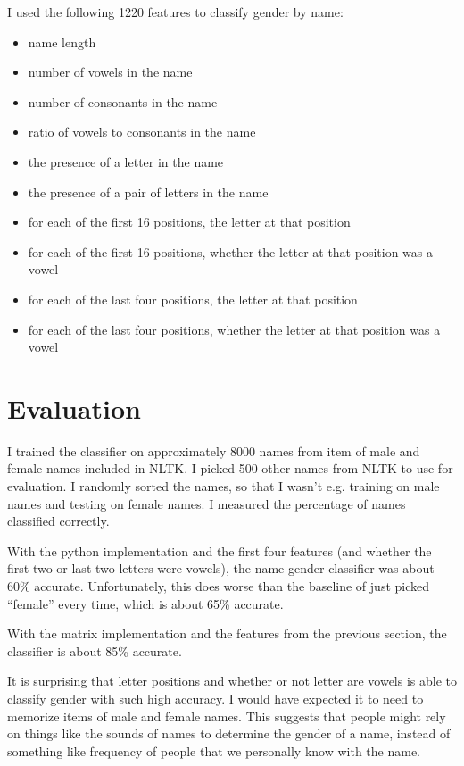 \documentclass{article}
\begin{document}
I used the following 1220 features to classify gender by name:

\begin{itemize}
\item name length
\item number of vowels in the name
\item number of consonants in the name
\item ratio of vowels to consonants in the name
\item the presence of a letter in the name
\item the presence of a pair of letters in the name
\item for each of the first 16 positions, the letter at that position
\item for each of the first 16 positions, whether the letter at that position was a vowel
\item for each of the last four positions, the letter at that position
\item for each of the last four positions, whether the letter at that position was a vowel
\end{itemize}

\section{Evaluation}

I trained the classifier on approximately 8000 names from item of male and female names included in NLTK. I picked 500 other names from NLTK to use for evaluation. I randomly sorted the names, so that I wasn't e.g. training on male names and testing on female names. I measured the percentage of names classified correctly.

With the python implementation and the first four features (and whether the first two or last two letters were vowels), the name-gender classifier was about 60\% accurate. Unfortunately, this does worse than the baseline of just picked ``female'' every time, which is about 65\% accurate.

With the matrix implementation and the features from the previous section, the classifier is about 85\% accurate.

It is surprising that letter positions and whether or not letter are vowels is able to classify gender with such high accuracy. I would have expected it to need to memorize items of male and female names. This suggests that people might rely on things like the sounds of names to determine the gender of a name, instead of something like frequency of people that we personally know with the name.
\end{document}
